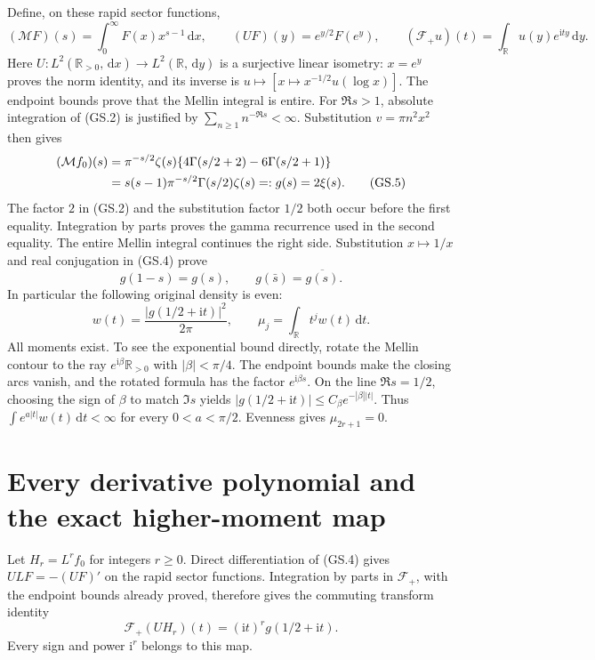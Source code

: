 \documentclass[11pt]{article}
\newcommand{\ii}{\mathrm i}
\newcommand{\dd}{\,\mathrm d}
\newcommand{\M}{\mathcal M}
\newcommand{\F}{\mathcal F}
\begin{document}
Define, on these rapid sector functions,
\begin{equation}
 (\M F)(s)=\int_0^\infty F(x)x^{s-1}\dd x,
 \qquad (UF)(y)=e^{y/2}F(e^y),
 \qquad (\F_+u)(t)=\int_{\mathbb R}u(y)e^{\ii ty}\dd y.
 \tag{GS.4}
\end{equation}
Here $U:L^2(\mathbb R_{>0},\dd x)\to L^2(\mathbb R,\dd y)$
is a surjective linear isometry: $x=e^y$ proves the norm identity,
and its inverse is $u\mapsto[x\mapsto x^{-1/2}u(\log x)]$.
The endpoint bounds prove that the Mellin integral is entire.
For $\Re s>1$, absolute integration of (GS.2) is justified by
$\sum_{n\ge1}n^{-\Re s}<\infty$. Substitution $v=\pi n^2x^2$
then gives
\begin{align}
 (\M f_0)(s)
 &=\pi^{-s/2}\zeta(s)
       \{4\Gamma(s/2+2)-6\Gamma(s/2+1)\}\notag\\
 &=s(s-1)\pi^{-s/2}\Gamma(s/2)\zeta(s)=:g(s)=2\xi(s).
 \tag{GS.5}
\end{align}
The factor $2$ in (GS.2) and the substitution factor $1/2$
both occur before the first equality. Integration by parts proves
the gamma recurrence used in the second equality. The entire Mellin
integral continues the right side. Substitution $x\mapsto1/x$
and real conjugation in (GS.4) prove
\begin{equation}
 g(1-s)=g(s),\qquad g(\bar s)=\overline{g(s)}.
 \tag{GS.6}
\end{equation}
In particular the following original density is even:
\begin{equation}
 w(t)=\frac{|g(1/2+\ii t)|^2}{2\pi},\qquad
 \mu_j=\int_{\mathbb R}t^j w(t)\dd t.\tag{GS.7}
\end{equation}
All moments exist. To see the exponential bound directly, rotate
the Mellin contour to the ray $e^{\ii\beta}\mathbb R_{>0}$ with
$|\beta|<\pi/4$. The endpoint bounds make the closing arcs vanish,
and the rotated formula has the factor $e^{\ii\beta s}$.
On the line $\Re s=1/2$, choosing the sign of $\beta$ to match
$\Im s$ yields $|g(1/2+\ii t)|\le C_\beta e^{-|\beta||t|}$.
Thus $\int e^{a|t|}w(t)\dd t<\infty$ for every $0<a<\pi/2$.
Evenness gives $\mu_{2r+1}=0$.

\section{Every derivative polynomial and the exact higher-moment map}

Let $H_r=L^rf_0$ for integers $r\ge0$. Direct differentiation of
(GS.4) gives $ULF=-(UF)'$ on the rapid sector functions. Integration
by parts in $\F_+$, with the endpoint bounds already proved, therefore
gives the commuting transform identity
\begin{equation}
 \F_+(UH_r)(t)=(\ii t)^r g(1/2+\ii t).\tag{GS.8}
\end{equation}
Every sign and power $\ii^r$ belongs to this map.
\end{document}
